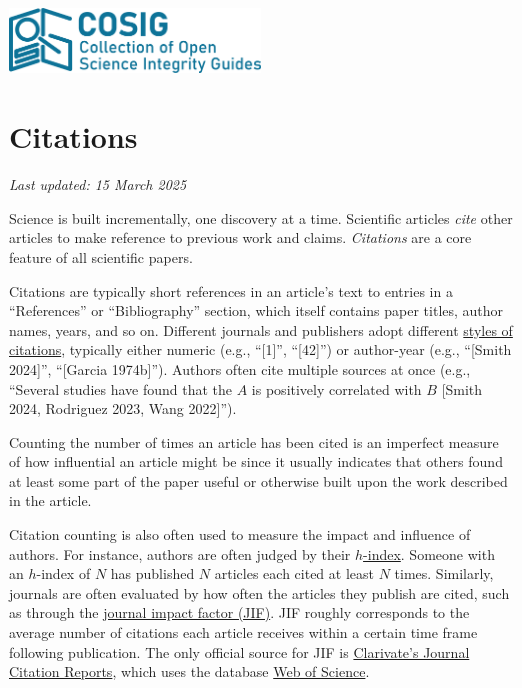 \documentclass[letterpaper, 12pt]{article}
\begin{document}
\flushleft
\includegraphics[width=0.5\textwidth]{img/home/241017_final_logo_mockup.png}

\section*{Citations}
\textit{Last updated: 15 March 2025}

Science is built incrementally, one discovery at a time.
Scientific articles \emph{cite} other articles to make reference to previous work and claims.
\emph{Citations} are a core feature of all scientific papers.

Citations are typically short references in an article's text to entries in a ``References'' or ``Bibliography'' section,
which itself contains paper titles, author names, years, and so on.
Different journals and publishers adopt different \href{https://libguides.brown.edu/citations/styles}{styles of citations}, typically either numeric (e.g., ``[1]'', ``[42]'')
or author-year (e.g., ``[Smith 2024]'', ``[Garcia 1974b]''). Authors often cite multiple sources at once (e.g., ``Several studies have found that the $A$ is positively correlated with $B$ [Smith 2024, Rodriguez 2023, Wang 2022]'').

Counting the number of times an article has been cited is an imperfect measure of how influential an article might be since it usually indicates that others found at least some part of the paper useful or otherwise built upon the work described in the article.

Citation counting is also often used to measure the impact and influence of authors. For instance, authors are often judged by their \href{https://doi.org/10.1073%2Fpnas.0507655102}{$h$-index}.
Someone with an $h$-index of $N$ has published $N$ articles each cited at least $N$ times. Similarly, journals are often evaluated by how often the articles they publish are cited, such as through the \href{https://doi.org/10.1001%2Fjama.295.1.90}{journal impact factor (JIF)}. JIF roughly corresponds to the average number of citations each article receives within a certain time frame following publication. The only official source for JIF is \href{https://clarivate.com/academia-government/scientific-and-academic-research/research-funding-analytics/journal-citation-reports/}{Clarivate's Journal Citation Reports}, which uses the database \href{https://clarivate.com/academia-government/scientific-and-academic-research/research-discovery-and-referencing/web-of-science/}{Web of Science}.
\end{document}
